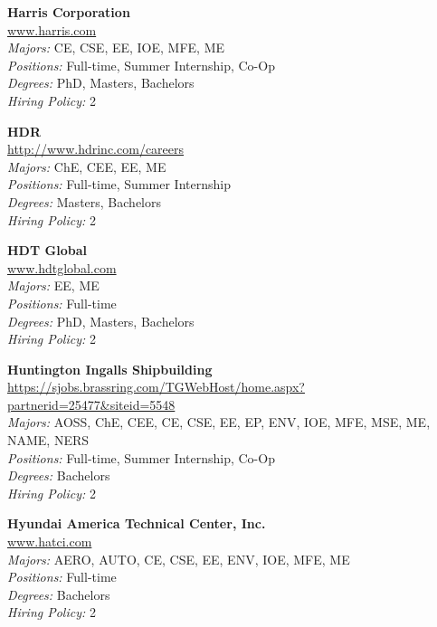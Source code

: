 \documentclass[twoside]{article}
\begin{document}
\begin{center}
\begin{multicols}{3}
\begin{minipage}{.9\columnwidth}{\Large\bf Harris Corporation }\\
	\url{www.harris.com}\\
	\emph{Majors:} CE, CSE, EE, IOE, MFE, ME\\
	\emph{Positions:} Full-time, Summer Internship, Co-Op\\
	\emph{Degrees:} PhD, Masters, Bachelors\\
	\emph{Hiring Policy:} 2\\
\end{minipage}
 
\begin{minipage}{.9\columnwidth}{\Large\bf HDR }\\
	\url{http://www.hdrinc.com/careers}\\
	\emph{Majors:} ChE, CEE, EE, ME\\
	\emph{Positions:} Full-time, Summer Internship\\
	\emph{Degrees:} Masters, Bachelors\\
	\emph{Hiring Policy:} 2\\
\end{minipage}
 
\begin{minipage}{.9\columnwidth}{\Large\bf HDT Global }\\
	\url{www.hdtglobal.com}\\
	\emph{Majors:} EE, ME\\
	\emph{Positions:} Full-time\\
	\emph{Degrees:} PhD, Masters, Bachelors\\
	\emph{Hiring Policy:} 2\\
\end{minipage}
 
\begin{minipage}{.9\columnwidth}{\Large\bf Huntington Ingalls Shipbuilding }\\
	\url{https://sjobs.brassring.com/TGWebHost/home.aspx?partnerid=25477&siteid=5548}\\
	\emph{Majors:} AOSS, ChE, CEE, CE, CSE, EE, EP, ENV, IOE, MFE, MSE, ME, NAME, NERS\\
	\emph{Positions:} Full-time, Summer Internship, Co-Op\\
	\emph{Degrees:} Bachelors\\
	\emph{Hiring Policy:} 2\\
\end{minipage}
 
\begin{minipage}{.9\columnwidth}{\Large\bf Hyundai America Technical Center, Inc. }\\
	\url{www.hatci.com}\\
	\emph{Majors:} AERO, AUTO, CE, CSE, EE, ENV, IOE, MFE, ME\\
	\emph{Positions:} Full-time\\
	\emph{Degrees:} Bachelors\\
	\emph{Hiring Policy:} 2\\
\end{minipage}
 

\end{multicols}
\end{center}
\end{document}
